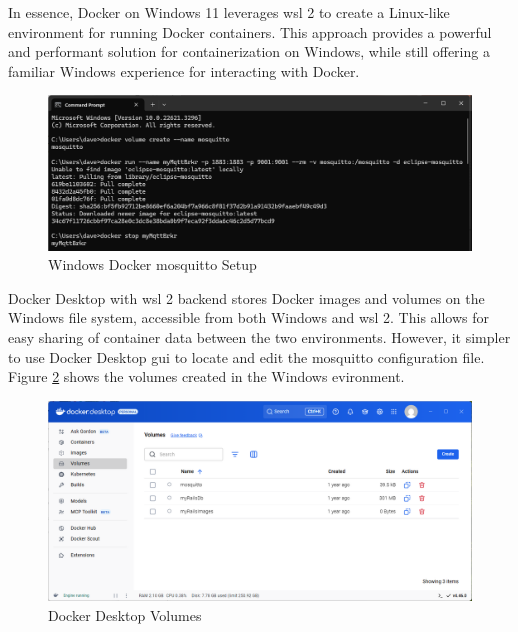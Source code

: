 In essence, Docker on Windows 11 leverages \gls{wsl 2} to create a Linux-like environment for running Docker containers. This approach provides a powerful and performant solution for containerization on Windows, while still offering a familiar Windows experience for interacting with Docker.
\begin{figure}[H]
    \centering
    \includegraphics[scale=0.5]{../Images/mosquitto-volume-win.png}
    \caption{Windows Docker mosquitto Setup}
    \label{fig:init-docker-cmds}
\end{figure}
Docker Desktop with \gls{wsl 2} backend stores Docker images and volumes on the Windows file system, accessible from both Windows and \gls{wsl 2}. This allows for easy sharing of container data between the two environments. However, it simpler to use Docker Desktop \gls{gui} to locate and edit the mosquitto configuration file. Figure \ref{fig:volumes-ms} shows the volumes created in the Windows evironment.
\begin{figure}[H]
    \centering
    \includegraphics[scale=0.4]{../Images/volumes-ms.png}
    \caption{Docker Desktop Volumes}
    \label{fig:volumes-ms}
\end{figure}
